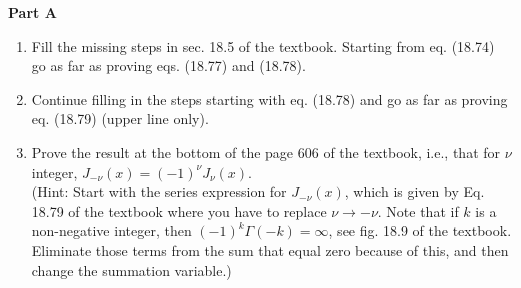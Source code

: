 \documentclass[fleqn]{article}
\begin{document}
  \textbf{Part A}
  \begin{enumerate}
    \item Fill the missing steps in sec. 18.5 of the textbook. Starting from eq. (18.74) go as far as proving eqs. (18.77) and (18.78).  


    \item Continue filling in the steps starting with eq. (18.78) and go as far as proving eq. (18.79) (upper line only). 
    
    
    \item Prove the result at the bottom of the page 606 of the textbook, i.e., that for $\nu$ integer, $J_{-\nu }(x)=(-1)^\nu J_{\nu }(x)$. \\
    (Hint: Start with the series expression for $J_{-\nu }(x)$, which is given by Eq. 18.79 of the textbook where you have to replace $\nu \rightarrow -\nu$. Note that if $k$ is a non-negative integer, then $(-1)^k \Gamma(-k) = \infty$, see fig. 18.9 of the textbook. Eliminate those terms from the sum that equal zero because of this, and then change the summation variable.)
    
  \end{enumerate}
\end{document}
